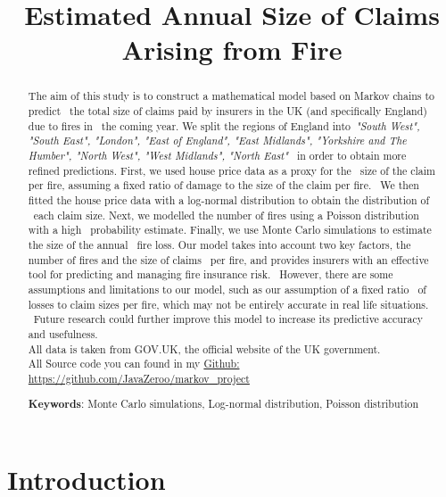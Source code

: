 \documentclass[12pt]{article}  %
\title{Estimated Annual Size of Claims Arising from Fire}  %
\begin{document}
\begin{abstract}
    The aim of this study is to construct a mathematical model based on Markov chains to predict \
    the total size of claims paid by insurers in the UK (and specifically England) due to fires in \
    the coming year. We split the regions of England into\ 
    \emph{"South West", "South East", "London", "East of England", "East Midlands", "Yorkshire and The Humber", "North West", "West Midlands", "North East"} \ 
    in order to obtain more refined predictions. First, we used house price data as a proxy for the \
    size of the claim per fire, assuming a fixed ratio of damage to the size of the claim per fire. \
    We then fitted the house price data with a log-normal distribution to obtain the distribution of \
    each claim size. Next, we modelled the number of fires using a Poisson distribution with a high \
    probability estimate. Finally, we use Monte Carlo simulations to estimate the size of the annual \
    fire loss. Our model takes into account two key factors, the number of fires and the size of claims \
    per fire, and provides insurers with an effective tool for predicting and managing fire insurance risk. \
    However, there are some assumptions and limitations to our model, such as our assumption of a fixed ratio \
    of losses to claim sizes per fire, which may not be entirely accurate in real life situations. \
    Future research could further improve this model to increase its predictive accuracy and usefulness. \\
    All data is taken from GOV.UK, the official website of the UK government.\\
    All Source code you can found in my \href{https://github.com/JavaZeroo/markov\_project}{Github: https://github.com/JavaZeroo/markov\_project}


    \vspace{5pt}
    \textbf{Keywords}: Monte Carlo simulations, Log-normal distribution, Poisson distribution

\end{abstract}

\maketitle  %
\tableofcontents  %


\section{Introduction}
\end{document}
